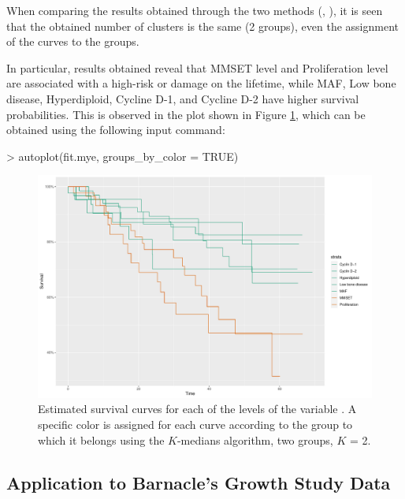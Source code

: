 When comparing the results obtained through the two methods (, ), it is seen that the obtained number of clusters  is the same (2 groups), even the assignment of the curves to the groups. 

In particular, results obtained  reveal that MMSET level and Proliferation level are associated with a high-risk or damage on the lifetime, while  MAF, Low bone disease, Hyperdiploid, Cycline D-1, and Cycline D-2  have higher survival probabilities. This is observed in the plot shown in Figure \ref{noramv:fig2kmedians}, which can be obtained using the following input command:


\begin{example}
> autoplot(fit.mye, groups_by_color = TRUE) 
\end{example}


\begin{figure}[htbp]
\includegraphics[width = 14cm]{myeloma_cancer_kmedians.pdf}
\caption{\label{noramv:fig2kmedians}
Estimated survival curves for each of the levels of the variable . A specific color is assigned for each curve according to the group to which it belongs using the $K$-medians algorithm, two groups, $K$ = 2.}
\end{figure}



\subsection{Application to Barnacle's Growth Study Data}

